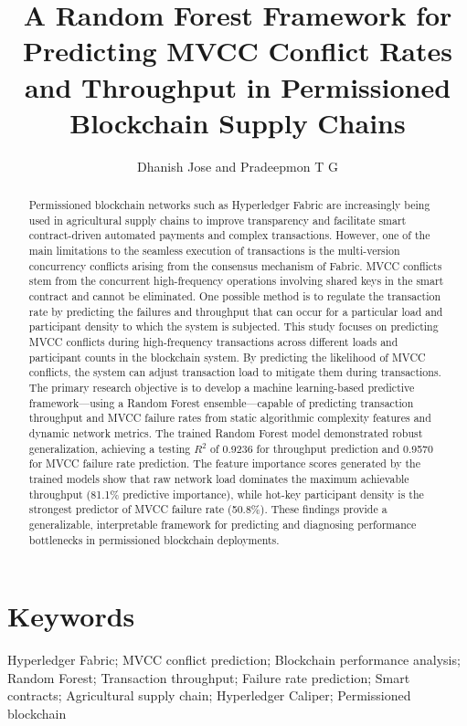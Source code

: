 \documentclass[12pt]{article}
\title{A Random Forest Framework for Predicting MVCC Conflict Rates and Throughput in Permissioned Blockchain Supply Chains}
\author{Dhanish Jose and Pradeepmon T G}
\affil{Department of Mechanical Engineering, National Institute of Technology Calicut, India}
\date{}
\begin{document}
	
	\maketitle
		\begin{abstract}
	Permissioned blockchain networks such as Hyperledger Fabric are increasingly being used in agricultural supply chains to improve transparency and facilitate smart contract-driven automated payments and complex transactions. However, one of the main limitations to the seamless execution of transactions is the multi-version concurrency conflicts arising from the consensus mechanism of Fabric. MVCC conflicts stem from the concurrent high-frequency operations involving shared keys in the smart contract and cannot be eliminated. One possible method is to regulate the transaction rate by predicting the failures and throughput that can occur for a particular load and participant density to which the system is subjected. This study focuses on predicting MVCC conflicts during high-frequency transactions across different loads and participant counts in the blockchain system. By predicting the likelihood of MVCC conflicts, the system can adjust transaction load to mitigate them during transactions. The primary research objective is to develop a machine learning-based predictive framework---using a Random Forest ensemble---capable of predicting transaction throughput and MVCC failure rates from static algorithmic complexity features and dynamic network metrics. The trained Random Forest model demonstrated robust generalization, achieving a testing $R^2$ of 0.9236 for throughput prediction and 0.9570 for MVCC failure rate prediction. The feature importance scores generated by the trained models show that raw network load dominates the maximum achievable throughput (81.1\% predictive importance), while hot-key participant density is the strongest predictor of MVCC failure rate (50.8\%). These findings provide a generalizable, interpretable framework for predicting and diagnosing performance bottlenecks in permissioned blockchain deployments.
	\end{abstract}
	
	
	
	
	
	\section*{Keywords}
	Hyperledger Fabric; MVCC conflict prediction; Blockchain performance analysis; 
	Random Forest; Transaction throughput; Failure rate prediction; Smart contracts; 
	Agricultural supply chain; Hyperledger Caliper; Permissioned blockchain
	
\end{document}
